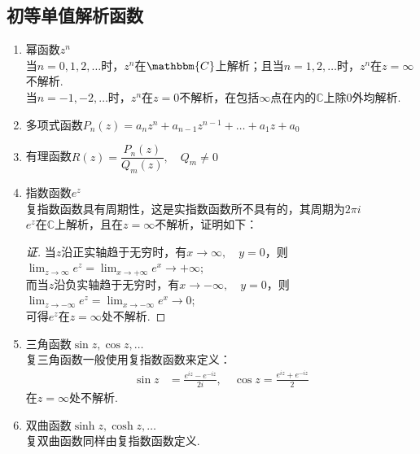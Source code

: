 \documentclass[12pt, a4paper]{ctexbook}
\begin{document}
            \subsection{初等单值解析函数}
                \allowdisplaybreaks
                \begin{enumerate}
                    \item 幂函数$z^n$\\
                        当$n = 0,1,2,\dots$时，$z^n$在$\mathbbm{C}$上解析；且当$n = 1,2,\dots$时，$z^n$在$z = \infty$不解析.\\
                        当$n = -1,-2,\dots$时，$z^n$在$z = 0$不解析，在包括$\infty$点在内的$\mathbb{C}$上除$0$外均解析.
                    \item 多项式函数$P_n(z) = a_nz^n + a_{n-1}z^{n-1} + \dots + a_1z + a_0$
                    \item 有理函数$R(z) = \dfrac{P_n(z)}{Q_m(z)}, \quad Q_m \neq 0$
                    \item 指数函数$e^z$\\
                        复指数函数具有周期性，这是实指数函数所不具有的，其周期为$2 \pi i$\\
                        $e^z$在$\mathbb{C}$上解析，且在$z = \infty$不解析，证明如下：
                        \begin{proof}[证]
                            当$z$沿正实轴趋于无穷时，有$x \to \infty, \quad y = 0$，则$\lim_{z \to \infty}e^z = \lim_{x \to +\infty}e^x \to +\infty$;\\
                            而当$z$沿负实轴趋于无穷时，有$x \to -\infty, \quad y = 0$，则$\lim_{z \to -\infty}e^z = \lim_{x \to -\infty}e^x \to 0$;\\
                            可得$e^z$在$z = \infty$处不解析.
                        \end{proof}
                    \item 三角函数$\sin{z}, \cos{z}, \dots$\\
                        复三角函数一般使用复指数函数来定义：
                        \begin{align*}
                            \sin{z} &= \frac{e^{iz} - e^{-iz}}{2i}, \quad \cos{z} = \frac{e^{iz} + e^{-iz}}{2}
                        \end{align*}
                        在$z = \infty$处不解析.
                    \item 双曲函数$\sinh{z}, \cosh{z}, \dots$\\
                        复双曲函数同样由复指数函数定义.

\end{enumerate}
\end{document}
